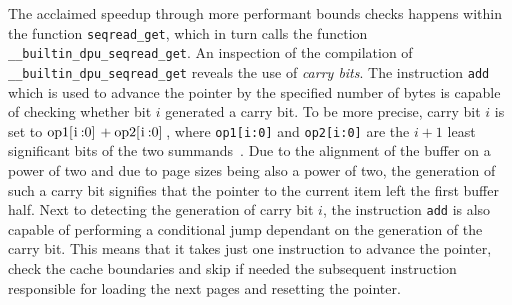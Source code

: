 The acclaimed speedup through more performant bounds checks happens within the function \lstinline|seqread_get|, which in turn calls the function \lstinline|__builtin_dpu_seqread_get|.
An inspection of the compilation of \lstinline|__builtin_dpu_seqread_get| reveals the use of \emph{carry bits}.
The instruction \lstinline|add| which is used to advance the pointer by the specified number of bytes is capable of checking whether bit \(i\) generated a carry bit.
To be more precise, carry bit \(i\) is set to \(\text{\lstinline|op1[i:0]|} + \text{\lstinline|op2[i:0]|}\), where \lstinline|op1[i:0]| and \lstinline|op2[i:0]| are the \(i + 1\) least significant bits of the two summands~\cite[DPU Handbook -- Specific Conditions Common To Addition and Subtraction]{upmemSDK}.
Due to the alignment of the buffer on a power of two and due to page sizes being also a power of two, the generation of such a carry bit signifies that the pointer to the current item left the first buffer half.
Next to detecting the generation of carry bit \(i\), the instruction \lstinline|add| is also capable of performing a conditional jump dependant on the generation of the carry bit.
This means that it takes just one instruction to advance the pointer, check the cache boundaries and skip \Dash if needed \Dash the subsequent instruction responsible for loading the next pages and resetting the pointer.
